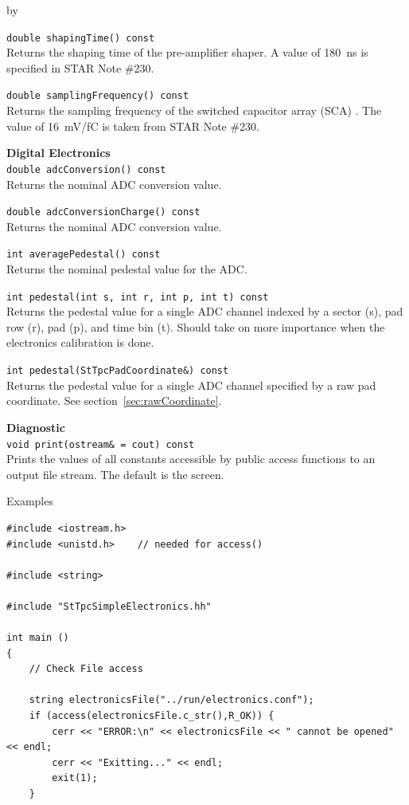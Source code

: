 \documentclass[twoside]{article}
\newcommand{\entrylabel}[1]{\mbox{\textbf{{#1}}}\hfil}%
\newenvironment{entry}
{\begin{list}{}%
    {\renewcommand{\makelabel}{\entrylabel}%
     \setlength{\labelwidth}{90pt}%
     \setlength{\leftmargin}{\labelwidth}
     \advance\leftmargin by \labelsep%
      }%
    }%
  {\end{list}}
\newcommand{\Entrylabel}[1]%
{\raisebox{0pt}[1ex][0pt]{\makebox[\labelwidth][l]%
    {\parbox[t]{\labelwidth}{\hspace{0pt}\textbf{{#1}}}}}}
\newenvironment{Entry}%
{\renewcommand{\entrylabel}{\Entrylabel}\begin{entry}}%
  {\end{entry}}
\begin{document}
\begin{Entry}
  \verb+double shapingTime() const+\\
  Returns the shaping time of the pre-amplifier shaper.
  A value of 180~ns is specified in STAR Note \#230.

  \verb+double samplingFrequency() const+\\
  Returns the sampling frequency of the switched capacitor array (SCA)
  .  The value of 16~mV/fC is taken from STAR Note \#230.

  {\bf Digital Electronics \\}
  \verb+double adcConversion() const+\\
  Returns the nominal ADC conversion value.

  \verb+double adcConversionCharge() const+\\
  Returns the nominal ADC conversion value.

  \verb+int averagePedestal() const+\\
  Returns the nominal pedestal value for the ADC.

  \verb+int pedestal(int s, int r, int p, int t) const+\\
  Returns the pedestal value for a single ADC channel indexed
  by a sector (s), pad row (r), pad (p), and time bin (t).
  Should take on more importance when the electronics calibration
  is done.

  \verb+int pedestal(StTpcPadCoordinate&) const+\\
  Returns the pedestal value for a single ADC channel specified
  by a raw pad coordinate.  See section~\ref{sec:rawCoordinate}.

  {\bf  Diagnostic \\}
  \verb+void print(ostream& = cout) const+\\
  Prints the values of all constants accessible by public access
  functions to an output file stream.  The default is the screen.

\item[Examples]
  
{\footnotesize
\begin{verbatim}
#include <iostream.h>
#include <unistd.h>    // needed for access()

#include <string>

#include "StTpcSimpleElectronics.hh"

int main ()
{
    // Check File access

    string electronicsFile("../run/electronics.conf");
    if (access(electronicsFile.c_str(),R_OK)) {
        cerr << "ERROR:\n" << electronicsFile << " cannot be opened" << endl;
        cerr << "Exitting..." << endl;
        exit(1);
    }


\end{verbatim}}
\end{Entry}
\end{document}
